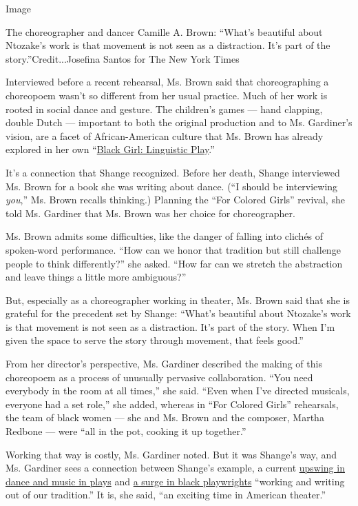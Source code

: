 Image

The choreographer and dancer Camille A. Brown: ``What's beautiful about
Ntozake's work is that movement is not seen as a distraction. It's part
of the story.''Credit...Josefina Santos for The New York Times

Interviewed before a recent rehearsal, Ms. Brown said that
choreographing a choreopoem wasn't so different from her usual practice.
Much of her work is rooted in social dance and gesture. The children's
games --- hand clapping, double Dutch --- important to both the original
production and to Ms. Gardiner's vision, are a facet of African-American
culture that Ms. Brown has already explored in her own
``\href{https://www.nytimes3xbfgragh.onion/2015/09/24/arts/dance/review-in-a-new-work-camille-a-brown-plays-with-empowerment.html?searchResultPosition=3}{Black
Girl: Linguistic Play}.''

It's a connection that Shange recognized. Before her death, Shange
interviewed Ms. Brown for a book she was writing about dance. (``I
should be interviewing \emph{you},'' Ms. Brown recalls thinking.)
Planning the ``For Colored Girls'' revival, she told Ms. Gardiner that
Ms. Brown was her choice for choreographer.

Ms. Brown admits some difficulties, like the danger of falling into
clichés of spoken-word performance. ``How can we honor that tradition
but still challenge people to think differently?'' she asked. ``How far
can we stretch the abstraction and leave things a little more
ambiguous?''

But, especially as a choreographer working in theater, Ms. Brown said
that she is grateful for the precedent set by Shange: ``What's beautiful
about Ntozake's work is that movement is not seen as a distraction. It's
part of the story. When I'm given the space to serve the story through
movement, that feels good.''

From her director's perspective, Ms. Gardiner described the making of
this choreopoem as a process of unusually pervasive collaboration. ``You
need everybody in the room at all times,'' she said. ``Even when I've
directed musicals, everyone had a set role,'' she added, whereas in
``For Colored Girls'' rehearsals, the team of black women --- she and
Ms. Brown and the composer, Martha Redbone --- were ``all in the pot,
cooking it up together.''

Working that way is costly, Ms. Gardiner noted. But it was Shange's way,
and Ms. Gardiner sees a connection between Shange's example, a current
\href{https://www.nytimes3xbfgragh.onion/2019/06/11/arts/dance/raja-feather-kelly.html?searchResultPosition=1}{upswing
in dance and music in plays} and
\href{https://www.nytimes3xbfgragh.onion/2019/04/25/theater/black-playwrights-theater.html?searchResultPosition=5}{a
surge in black playwrights} ``working and writing out of our
tradition.'' It is, she said, ``an exciting time in American theater.''

